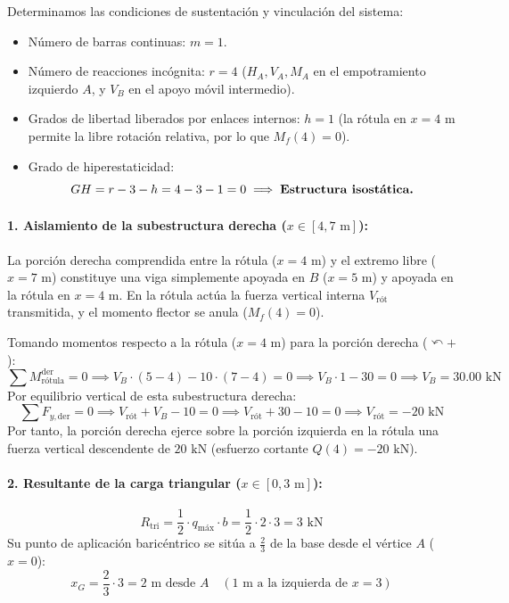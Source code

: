 
Determinamos las condiciones de sustentación y vinculación del sistema:
\begin{itemize}
    \item Número de barras continuas: $m = 1$.
    \item Número de reacciones incógnita: $r = 4$ ($H_A, V_A, M_A$ en el empotramiento izquierdo $A$, y $V_B$ en el apoyo móvil intermedio).
    \item Grados de libertad liberados por enlaces internos: $h = 1$ (la rótula en $x = 4\text{ m}$ permite la libre rotación relativa, por lo que $M_f(4) = 0$).
    \item Grado de hiperestaticidad:
    \[
        GH = r - 3 - h = 4 - 3 - 1 = 0 \implies \text{\textbf{Estructura isostática.}}
    \]
\end{itemize}


\paragraph{1. Aislamiento de la subestructura derecha ($x \in [4, 7\text{ m}]$):}
La porción derecha comprendida entre la rótula ($x = 4\text{ m}$) y el extremo libre ($x = 7\text{ m}$) constituye una viga simplemente apoyada en $B$ ($x = 5\text{ m}$) y apoyada en la rótula en $x = 4\text{ m}$. En la rótula actúa la fuerza vertical interna $V_{\text{rót}}$ transmitida, y el momento flector se anula ($M_f(4) = 0$).

Tomando momentos respecto a la rótula ($x = 4\text{ m}$) para la porción derecha ($\curvearrowleft +$):
\begin{equation}
    \sum M_{\text{rótula}}^{\text{der}} = 0 \implies V_B \cdot (5 - 4) - 10 \cdot (7 - 4) = 0 \implies V_B \cdot 1 - 30 = 0 \implies \boxed{V_B = 30.00\text{ kN}}
\end{equation}
Por equilibrio vertical de esta subestructura derecha:
\begin{equation}
    \sum F_{y,\text{der}} = 0 \implies V_{\text{rót}} + V_B - 10 = 0 \implies V_{\text{rót}} + 30 - 10 = 0 \implies V_{\text{rót}} = -20\text{ kN}
\end{equation}
Por tanto, la porción derecha ejerce sobre la porción izquierda en la rótula una fuerza vertical descendente de $20\text{ kN}$ (esfuerzo cortante $Q(4) = -20\text{ kN}$).

\paragraph{2. Resultante de la carga triangular ($x \in [0, 3\text{ m}]$):}
\[
    R_{\text{tri}} = \frac{1}{2} \cdot q_{\text{máx}} \cdot b = \frac{1}{2} \cdot 2 \cdot 3 = 3\text{ kN}
\]
Su punto de aplicación baricéntrico se sitúa a $\frac{2}{3}$ de la base desde el vértice $A$ ($x = 0$):
\[
    x_G = \frac{2}{3} \cdot 3 = 2\text{ m desde } A \quad (1\text{ m a la izquierda de } x=3)
\]


